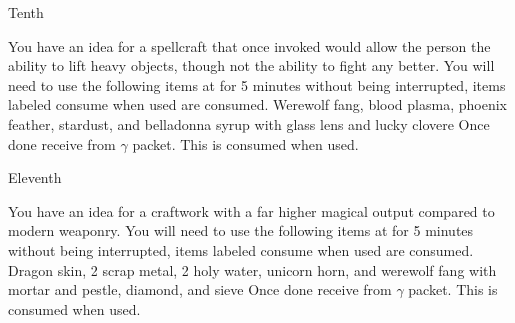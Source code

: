 \documentclass[greennotebook]{guildcamp3} %
\begin{document}
\begin{page}{Tenth}
	
	You have an idea for a spellcraft that once invoked would allow the person the ability to lift heavy objects, though not the ability to fight any better.
	You will need to use the following items at \sMageWorkbench{} for 5 minutes without being interrupted, items labeled consume when used are consumed.
	Werewolf fang, blood plasma, phoenix feather, stardust, and belladonna syrup with glass lens and lucky clovere
	Once done receive \iStrengthSpell{} from $\gamma$ packet. This is consumed when used. 
	
\end{page}

\begin{page}{Eleventh}
	
	You have an idea for a craftwork with a far higher magical output compared to modern weaponry.
	You will need to use the following items at \sMageWorkbench{} for 5 minutes without being interrupted, items labeled consume when used are consumed.
	Dragon skin, 2 scrap metal, 2 holy water, unicorn horn, and werewolf fang with mortar and pestle, diamond, and sieve
	Once done receive \iUpgradedMagicGun{} from $\gamma$ packet. This is consumed when used. 
	
\end{page}




\endnotebook
\end{document}
